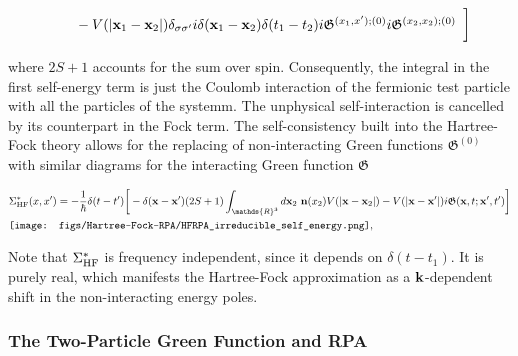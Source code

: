 \documentclass{homework}
\begin{document}
\begin{equation}
\begin{split}
\begin{array}{cc}
             \textnormal{ } \textnormal{ } \textnormal{ } \textnormal{ } - V(|{\bf x}_1 - {\bf x}_2|)\delta_{\sigma \sigma'} i \delta({\bf x}_1 - {\bf x}_2) \delta(t_1-t_2) 
                i \mathfrak{G}^{(x_1,x'); (0)} i \mathfrak{G}^{(x_2, x_2); (0)} 
                \end{array} \bigg] \\
    \end{split}
\end{equation}

where $2S+1$ accounts for the sum over spin. Consequently, the integral in the first self-energy term is just the Coulomb interaction of the fermionic test particle with all the particles of the systemm. The unphysical self-interaction is cancelled by its counterpart in the Fock term. The self-consistency built into the Hartree-Fock theory allows for the replacing of non-interacting Green functions $\mathfrak{G}^{(0)}$ with similar diagrams for the interacting Green function $\mathfrak{G}$

\begin{equation}
\begin{split}
    &\Sigma^{*}_{\textnormal{HF}}(x,x') =  - \frac{1}{\hbar} \delta(t-t') \bigg[-\delta({\bf x} - {\bf x}') (2S+1) \int_{\mathds{R}^3} d{\bf x}_2 \blanky {\bf n}(x_2) V(|{\bf x}- {\bf x}_2|) - V(|{\bf x} - {\bf x'}|) i \mathfrak{G}({\bf x}, t; {\bf x}', t')\bigg]
        \\
    & \texttt{[image: figs/Hartree-Fock-RPA/HFRPA\_irreducible\_self\_energy.png]},
\end{split}
\end{equation}

Note that $\Sigma_{\textnormal{HF}}^{*}$ is frequency independent, since it depends on $\delta(t-t_1)$. It is purely real, which manifests the Hartree-Fock approximation as a ${\bf k}$-dependent shift in the non-interacting energy poles. \\

\subsubsection{The Two-Particle Green Function and RPA}
\end{document}
